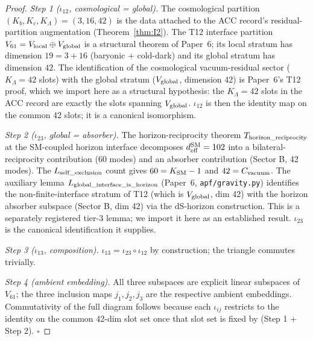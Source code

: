 \documentclass[11pt]{article}
\theoremstyle{plain}
\theoremstyle{definition}
\theoremstyle{remark}
\begin{document}
\begin{proof}
\emph{Step 1 ($\iota_{12}$, cosmological = global).}  The cosmological partition $(K_b, K_c, K_\Lambda) = (3, 16, 42)$ is the data attached to the ACC record's residual-partition augmentation (Theorem~\ref{thm:I2}).  The T12 interface partition $V_{61} = V_{\rm local} \oplus V_{\rm global}$ is a structural theorem of Paper~6; its local stratum has dimension $19 = 3 + 16$ (baryonic + cold-dark) and its global stratum has dimension $42$.  The identification of the cosmological vacuum-residual sector ($K_\Lambda = 42$ slots) with the global stratum ($V_{\rm global}$, dimension 42) is Paper~6's T12 proof, which we import here as a structural hypothesis: the $K_\Lambda = 42$ slots in the ACC record are exactly the slots spanning $V_{\rm global}$.  $\iota_{12}$ is then the identity map on the common 42 slots; it is a canonical isomorphism.

\emph{Step 2 ($\iota_{23}$, global = absorber).}  The horizon-reciprocity theorem $T_{\rm horizon\_reciprocity}$ at the SM-coupled horizon interface decomposes $d_{\rm eff}^{\rm SM} = 102$ into a bilateral-reciprocity contribution (60 modes) and an absorber contribution (Sector B, 42 modes).  The $L_{\rm self\_exclusion}$ count gives $60 = K_{\rm SM} - 1$ and $42 = C_{\rm vacuum}$.  The auxiliary lemma $L_{\rm global\_interface\_is\_horizon}$ (Paper~6, \texttt{apf/gravity.py}) identifies the non-finite-interface stratum of T12 (which is $V_{\rm global}$, dim 42) with the horizon absorber subspace (Sector B, dim 42) via the dS-horizon construction.  This is a separately registered tier-3 lemma; we import it here as an established result.  $\iota_{23}$ is the canonical identification it supplies.

\emph{Step 3 ($\iota_{13}$, composition).}  $\iota_{13} = \iota_{23} \circ \iota_{12}$ by construction; the triangle commutes trivially.

\emph{Step 4 (ambient embedding).}  All three subspaces are explicit linear subspaces of $V_{61}$; the three inclusion maps $j_1, j_2, j_3$ are the respective ambient embeddings.  Commutativity of the full diagram follows because each $\iota_{ij}$ restricts to the identity on the common 42-dim slot set once that slot set is fixed by (Step 1 + Step 2).  $\square$
\end{proof}
\end{document}

